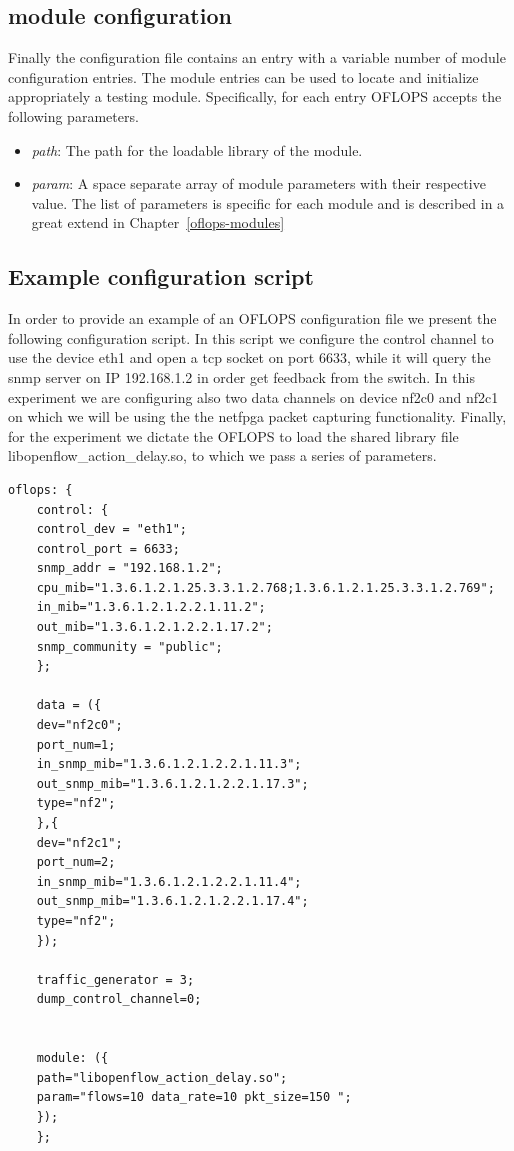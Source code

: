 \documentclass{book}
\begin{document}
\subsection{module configuration}

Finally the configuration file contains an entry with a variable number
of module configuration entries. The module entries can be used to locate 
and initialize appropriately a testing module. Specifically, for each entry
OFLOPS accepts the following parameters. 

\begin{itemize}
    \item \emph{path}: The path for the loadable library of the module. 
    \item \emph{param}: A space separate array of module parameters with their 
        respective value. The list of parameters is specific for each module and is 
        described in a great extend in Chapter~\ref{oflops-modules}
\end{itemize}

\subsection{Example configuration script}

In order to provide an example of an OFLOPS configuration file we present the
following configuration script. In this script we configure the control channel
to use the device eth1 and open a tcp socket on port 6633, while it will query
the snmp server on IP 192.168.1.2 in order get feedback from the switch. In this
experiment we are configuring also two data channels on device nf2c0 and nf2c1
on which we will be using the the netfpga packet capturing functionality.
Finally, for the experiment we dictate the OFLOPS to load the shared library
file libopenflow\_action\_delay.so, to which we pass a series of parameters. 

\lstset{language=Java,numbers=left,frame=single,title=oflops.cfg}
\begin{lstlisting}[frame=single]
    oflops: {
    control: {
    control_dev = "eth1";
    control_port = 6633;
    snmp_addr = "192.168.1.2";
    cpu_mib="1.3.6.1.2.1.25.3.3.1.2.768;1.3.6.1.2.1.25.3.3.1.2.769";  
    in_mib="1.3.6.1.2.1.2.2.1.11.2";
    out_mib="1.3.6.1.2.1.2.2.1.17.2";
    snmp_community = "public";
    };

    data = ({
    dev="nf2c0";
    port_num=1;
    in_snmp_mib="1.3.6.1.2.1.2.2.1.11.3";
    out_snmp_mib="1.3.6.1.2.1.2.2.1.17.3";
    type="nf2";
    },{
    dev="nf2c1";
    port_num=2;
    in_snmp_mib="1.3.6.1.2.1.2.2.1.11.4";
    out_snmp_mib="1.3.6.1.2.1.2.2.1.17.4";
    type="nf2";
    });

    traffic_generator = 3;
    dump_control_channel=0;


    module: ({
    path="libopenflow_action_delay.so";
    param="flows=10 data_rate=10 pkt_size=150 ";
    });
    };


\end{lstlisting}
\end{document}
